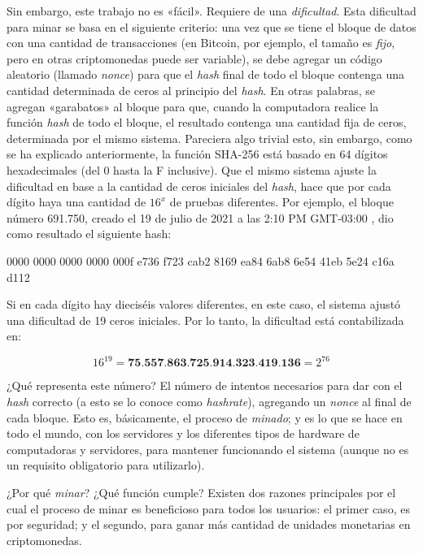 \documentclass[12pt,a4paper,twoside]{book}
\begin{document}
Sin embargo, este trabajo no es «fácil». Requiere de una \textit{dificultad}. Esta dificultad para minar se basa en el siguiente criterio: una vez que se tiene el bloque de datos con una cantidad de transacciones (en Bitcoin, por ejemplo, el tamaño es \textit{fijo}, pero en otras criptomonedas puede ser variable), se debe agregar un código aleatorio (llamado \textit{nonce}) para que el \textit{hash} final de todo el bloque contenga una cantidad determinada de ceros al principio del \textit{hash}. En otras palabras, se agregan «garabatos» al bloque para que, cuando la computadora realice la función \textit{hash} de todo el bloque, el resultado contenga una cantidad fija de ceros, determinada por el mismo sistema. Pareciera algo trivial esto, sin embargo, como se ha explicado anteriormente, la función SHA-256 está basado en 64 dígitos hexadecimales (del 0 hasta la F inclusive). Que el mismo sistema ajuste la dificultad en base a la cantidad de ceros iniciales del \textit{hash}, hace que por cada dígito haya una cantidad de $ 16^x $ de pruebas diferentes. Por ejemplo, el bloque número 691.750, creado el 19 de julio de 2021 a las 2:10 PM GMT-03:00 \cite{bitcoinpool}, dio como resultado el siguiente hash:

\begin{center}
0000 0000 0000 0000 000f e736 f723 cab2 8169 ea84 6ab8 6e54 41eb 5e24 c16a d112
\end{center}

Si en cada dígito hay dieciséis valores diferentes, en este caso, el sistema ajustó una dificultad de 19 ceros iniciales. Por lo tanto, la dificultad está contabilizada en:

\begin{equation*}
16^{19} = \textbf{75.557.863.725.914.323.419.136} = 2^{76}
\end{equation*}

¿Qué representa este número? El número de intentos necesarios para dar con el \textit{hash} correcto (a esto se lo conoce como \textit{hashrate}), agregando un \textit{nonce} al final de cada bloque. Esto es, básicamente, el proceso de \textit{minado}; y es lo que se hace en todo el mundo, con los servidores y los diferentes tipos de hardware de computadoras y servidores, para mantener funcionando el sistema (aunque no es un requisito obligatorio para utilizarlo).

¿Por qué \textit{minar}? ¿Qué función cumple? Existen dos razones principales por el cual el proceso de minar es beneficioso para todos los usuarios: el primer caso, es por seguridad; y el segundo, para ganar más cantidad de unidades monetarias en criptomonedas.
\end{document}
